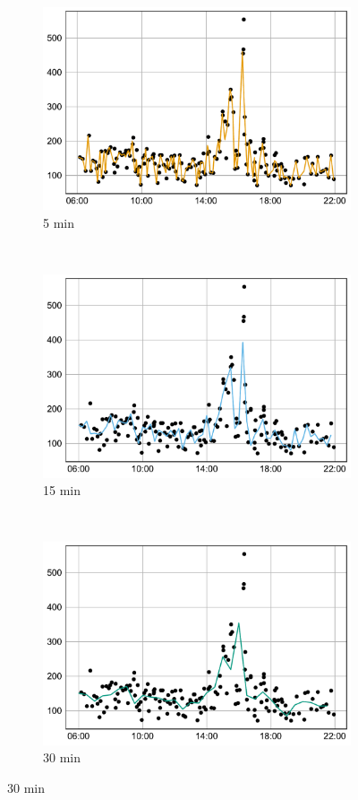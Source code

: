 \documentclass[preprint,11pt,5p,twocolumn]{elsarticle}
\begin{document}
\begin{figure}[!t]
    \centering
    \begin{subfigure}[t]{0.31\textwidth}
        \centering
        \includegraphics[width=\textwidth]{plots/decycle_5min_n.pdf}
        \caption{5 min}
    \end{subfigure}%
    ~ 
    \begin{subfigure}[t]{0.31\textwidth}
        \centering
        \includegraphics[width=\textwidth]{plots/decycle_15min_n.pdf}
        \caption{15 min}
    \end{subfigure}
    ~
    \begin{subfigure}[t]{0.31\textwidth}
        \centering
        \includegraphics[width=\textwidth]{plots/decycle_30min_n.pdf}
        \caption{30 min}
    \end{subfigure}


\end{figure}
\end{document}

